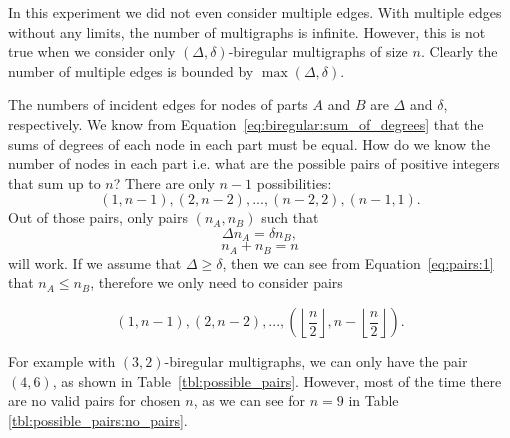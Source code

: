 In this experiment we did not even consider multiple edges.
With multiple edges without any limits, the number of multigraphs is infinite.
However, this is not true when we consider only $(\Delta, \delta)$-biregular multigraphs of size $n$.
Clearly the number of multiple edges is bounded by $\max(\Delta, \delta)$.

The numbers of incident edges for nodes of parts $A$ and $B$ are $\Delta$ and $\delta$, respectively.
We know from Equation~\ref{eq:biregular:sum_of_degrees} that the sums of degrees of each node in each part must be equal.
How do we know the number of nodes in each part i.e. what are the possible pairs of positive integers that sum up to $n$?
There are only $n-1$ possibilities:
$$(1, n-1), (2, n-2), ..., (n-2, 2), (n-1, 1).$$
Out of those pairs, only pairs $(n_A, n_B)$ such that
\begin{equation} \label{eq:pairs:1}
  \Delta n_A = \delta n_B,
\end{equation}
\begin{equation} \label{eq:pairs:2}
n_A + n_B = n
\end{equation}
will work.
If we assume that $\Delta \geq \delta$, then we can see from Equation~\ref{eq:pairs:1} that $n_A\leq n_B$, therefore we only need to consider pairs

$$(1, n-1), (2, n-2), ..., (\left\lfloor\frac{n}{2}\right\rfloor, n - \left\lfloor\frac{n}{2}\right\rfloor).$$

For example with $(3,2)$-biregular multigraphs, we can only have the pair $(4, 6)$, as shown in Table~\ref{tbl:possible_pairs}.
However, most of the time there are no valid pairs for chosen $n$, as we can see for $n=9$ in Table \ref{tbl:possible_pairs:no_pairs}.


